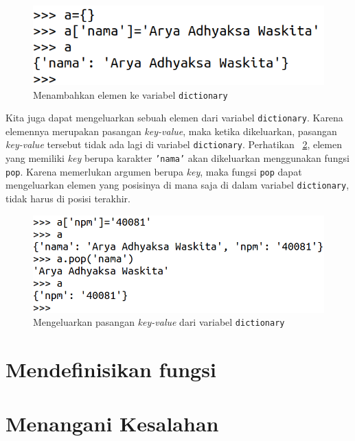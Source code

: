 \begin{figure}[h!]
  \begin{center}
    \includegraphics[scale=1.25]{pics/dictionary.png}
    \caption{Menambahkan elemen ke variabel \texttt{dictionary}}
    \label{fig:dict}
  \end{center}
\end{figure}

Kita juga dapat mengeluarkan sebuah elemen dari variabel \texttt{dictionary}. Karena elemennya merupakan pasangan \textit{key-value}, maka ketika dikeluarkan, pasangan \textit{key-value} tersebut tidak ada lagi di variabel \texttt{dictionary}. Perhatikan \figurename~\ref{fig:popDict}, elemen yang memiliki \textit{key} berupa karakter \texttt{'nama'} akan dikeluarkan menggunakan fungsi \texttt{pop}. Karena memerlukan argumen berupa \textit{key}, maka fungsi \texttt{pop} dapat mengeluarkan elemen yang posisinya di mana saja di dalam variabel \texttt{dictionary}, tidak harus di posisi terakhir.  

\begin{figure}
  \begin{center}
    \includegraphics[scale=1.25]{pics/popDict.png}
    \caption{Mengeluarkan pasangan \textit{key-value} dari variabel \texttt{dictionary}}
    \label{fig:popDict}
  \end{center}
\end{figure}

\section{Mendefinisikan fungsi}
\section{Menangani Kesalahan}
